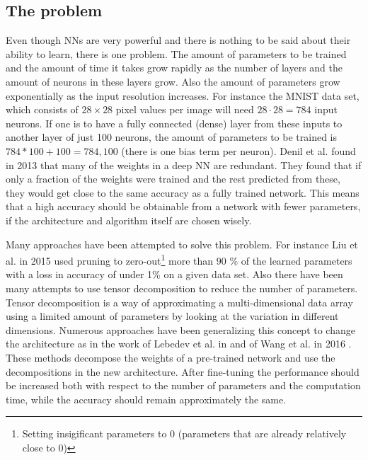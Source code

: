 \subsection{The problem}
Even though NNs are very powerful and there is nothing to be said about their ability to learn, there is one problem. The amount of parameters to be trained and the amount of time it takes grow rapidly as the number of layers and the amount of neurons in these layers grow. Also the amount of parameters grow exponentially as the input resolution increases. For instance the MNIST data set, which consists of $28\times28$ pixel values per image will need $28\cdot28 = 784$ input neurons. If one is to have a fully connected (dense) layer from these inputs to another layer of just 100 neurons, the amount of parameters to be trained is $784 * 100 + 100 = 784,100$ (there is one bias term per neuron). Denil et al. found in 2013 that many of the weights in a deep NN are redundant\cite{Denil2013}. They found that if only a fraction of the weights were trained and the rest predicted from these, they would get close to the same accuracy as a fully trained network. This means that a high accuracy should be obtainable from a network with fewer parameters, if the architecture and algorithm itself are chosen wisely.

Many approaches have been attempted to solve this problem. For instance Liu et al. in 2015 used pruning to zero-out\footnote{Setting insigificant parameters to 0 (parameters that are already relatively close to 0)} more than 90 \% of the learned parameters with a loss in accuracy of under 1\% on a given data set. Also there have been many attempts to use tensor decomposition to reduce the number of parameters. Tensor decomposition is a way of approximating a multi-dimensional data array using a limited amount of parameters by looking at the variation in different dimensions. Numerous approaches have been generalizing this concept to change the architecture as in the work of Lebedev et al. in \cite{Lebedev2015} and of Wang et al. in 2016 \cite{Wang2016}. These methods decompose the weights of a pre-trained network and use the decompositions in the new architecture. After fine-tuning the performance should be increased both with respect to the number of parameters and the computation time, while the accuracy should remain approximately the same.

